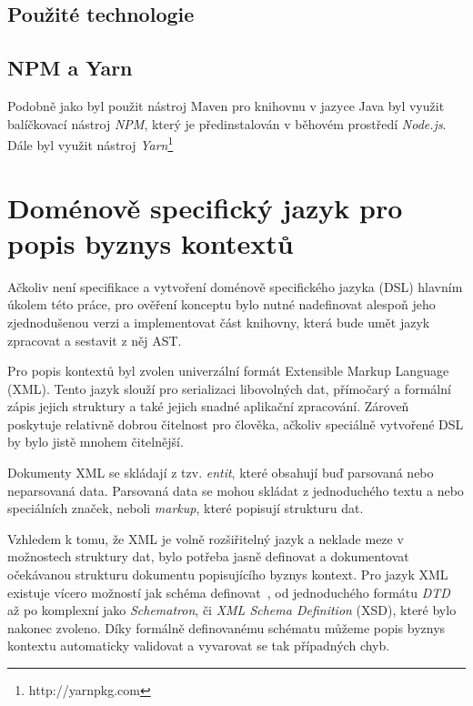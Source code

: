 \subsection{Použité technologie}

\subsection{NPM a Yarn}

Podobně jako byl použit nástroj Maven pro knihovnu v jazyce Java byl
využit balíčkovací nástroj \textit{NPM}, který je předinstalován
v běhovém prostředí \textit{Node.js}. Dále byl využit nástroj
\textit{Yarn}\footnote{http://yarnpkg.com} %

\section{Doménově specifický jazyk pro popis byznys kontextů}

Ačkoliv není specifikace a vytvoření doménově specifického jazyka (DSL) %
hlavním úkolem této práce, pro ověření konceptu bylo nutné nadefinovat
alespoň jeho zjednodušenou verzi a implementovat část knihovny, která
bude umět jazyk zpracovat a sestavit z něj AST. %

Pro popis kontextů byl zvolen univerzální formát Extensible
Markup Language~\cite{bray1997extensible} (XML). Tento
jazyk slouží pro serializaci libovolných dat, přímočarý a formální
zápis jejich struktury a také jejich snadné aplikační zpracování.
Zároveň poskytuje relativně dobrou čitelnost pro člověka, ačkoliv
speciálně vytvořené DSL by bylo jistě mnohem čitelnější.

Dokumenty XML se skládají z tzv. \textit{entit}, které obsahují
buď parsovaná nebo neparsovaná data. Parsovaná data se mohou skládat
z jednoduchého textu a nebo speciálních značek,
neboli \textit{markup}, které popisují strukturu dat.

Vzhledem k tomu, že XML je volně rozšiřitelný jazyk a neklade
meze v možnostech struktury dat, bylo potřeba jasně definovat
a dokumentovat očekávanou strukturu dokumentu popisujícího
byznys kontext. Pro jazyk XML existuje vícero možností jak schéma
definovat~\cite{lee2000comparative}, od jednoduchého formátu
\textit{DTD} až po komplexní jako \textit{Schematron}, či
\textit{XML Schema Definition} (XSD), které bylo nakonec zvoleno.
Díky formálně definovanému schématu můžeme popis byznys kontextu
automaticky validovat a vyvarovat se tak případných chyb.

